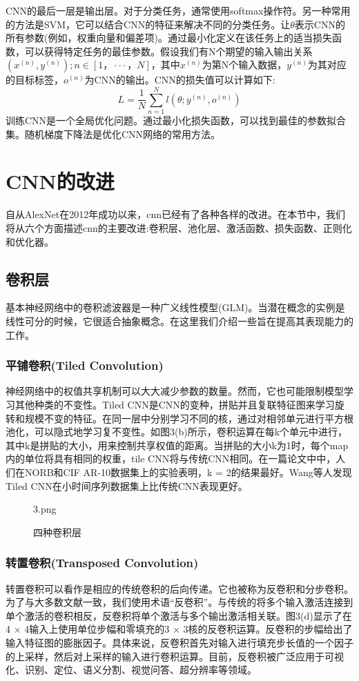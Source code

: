 \documentclass[final]{cvpr}
\begin{document}
CNN的最后一层是输出层。对于分类任务，通常使用softmax操作符。另一种常用的方法是SVM，它可以结合CNN的特征来解决不同的分类任务。让\emph{\textbf{$\theta$}}表示CNN的所有参数(例如，权重向量和偏差项)。通过最小化定义在该任务上的适当损失函数，可以获得特定任务的最佳参数。假设我们有N个期望的输入输出关系${(x^{(n)}, y^{(n)}); n\in [1，···，N]}$，其中$x^(n)$为第N个输入数据，$y^(n)$为其对应的目标标签，$o^(n)$为CNN的输出。CNN的损失值可以计算如下:
\begin{equation}
	L = \frac{1}{N}\sum_{n=1}^{N}l(\theta;y^{(n)},o^{(n)})
\end{equation}
训练CNN是一个全局优化问题。通过最小化损失函数，可以找到最佳的参数拟合集。随机梯度下降法是优化CNN网络的常用方法。

\section{CNN的改进}
自从AlexNet在2012年成功以来，cnn已经有了各种各样的改进。在本节中，我们将从六个方面描述cnn的主要改进:卷积层、池化层、激活函数、损失函数、正则化和优化器。

\subsection{卷积层}
基本神经网络中的卷积滤波器是一种广义线性模型(GLM)。当潜在概念的实例是线性可分的时候，它很适合抽象概念。在这里我们介绍一些旨在提高其表现能力的工作。
\subsubsection{平铺卷积(Tiled Convolution)}
神经网络中的权值共享机制可以大大减少参数的数量。然而，它也可能限制模型学习其他种类的不变性。Tiled CNN是CNN的变种，拼贴并且复联特征图来学习旋转和规模不变的特征。在同一层中分别学习不同的核，通过对相邻单元进行平方根池化，可以隐式地学习复不变性。如图3(b)所示，卷积运算在每k个单元中进行，其中k是拼贴的大小，用来控制共享权值的距离。当拼贴的大小k为1时，每个map内的单位将具有相同的权重，tile CNN将与传统CNN相同。在一篇论文中中，人们在NORB和CIF AR-10数据集上的实验表明，k = 2的结果最好。Wang等人发现Tiled CNN在小时间序列数据集上比传统CNN表现更好。
\begin{figure}[t!]
	\begin{overpic}[width=\columnwidth]{3.png}
	\end{overpic}
	\caption{四种卷积层
	}\label{fig:LeNet}
\end{figure}
\subsubsection{转置卷积(Transposed Convolution)}
转置卷积可以看作是相应的传统卷积的后向传递。它也被称为反卷积和分步卷积。为了与大多数文献一致，我们使用术语“反卷积”。与传统的将多个输入激活连接到单个激活的卷积相反，反卷积将单个激活与多个输出激活相关联。图3(d)显示了在4 × 4输入上使用单位步幅和零填充的3 × 3核的反卷积运算。反卷积的步幅给出了输入特征图的膨胀因子。具体来说，反卷积首先对输入进行填充步长值的一个因子的上采样，然后对上采样的输入进行卷积运算。目前，反卷积被广泛应用于可视化、识别、定位、语义分割、视觉问答、超分辨率等领域。
\end{document}
